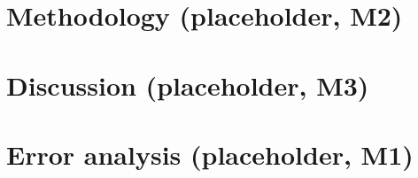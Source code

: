 \documentclass[11pt,twocolumn]{article}
\begin{document}
\section{Methodology (placeholder, M2)}\label{sec:method}
\section{Discussion (placeholder, M3)}\label{sec:discussion}
\section{Error analysis (placeholder, M1)}\label{sec:errors}

\appendix

\end{document}
